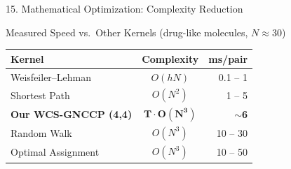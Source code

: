 \documentclass[aspectratio=169, 11pt]{beamer}
\begin{document}
\begin{frame}{15. Mathematical Optimization: Complexity Reduction}
\vspace{0.5em}

\begin{block}{Measured Speed vs.\ Other Kernels (drug-like molecules, $N{\approx}30$)}
\centering\small
\renewcommand{\arraystretch}{1.15}
\begin{tabular}{lcr}
\toprule
\textbf{Kernel} & \textbf{Complexity} & \textbf{ms/pair} \\
\midrule
Weisfeiler--Lehman & $O(hN)$ & 0.1 -- 1 \\
Shortest Path & $O(N^2)$ & 1 -- 5 \\
\textbf{Our WCS-GNCCP (4,4)} & $\mathbf{T\!\cdot\!O(N^3)}$ & \textbf{$\sim$6} \\
Random Walk & $O(N^3)$ & 10 -- 30 \\
Optimal Assignment & $O(N^3)$ & 10 -- 50 \\
\bottomrule
\end{tabular}
\end{block}
\end{frame}
\end{document}
